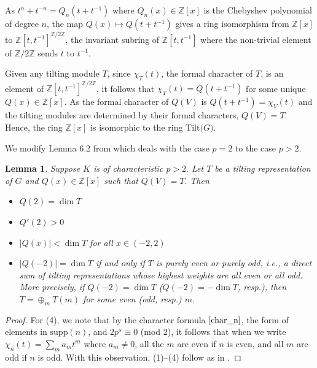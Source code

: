 \documentclass[11 pt]{amsart}
\theoremstyle{plain}
\newtheorem{lemma}[thm]{Lemma}
\theoremstyle{definition}
\theoremstyle{remark}
\def\Z{\mathbb{Z}}
\def\supp{\text{supp}}
\begin{document}
As $t^n+t^{-n}=Q_n(t+t^{-1})$ where $Q_n(x)\in \Z[x]$ is the Chebyshev polynomial of degree $n$, the map $Q(x) \mapsto Q(t+t^{-1})$ gives a ring  isomorphism from $\Z[x]$ to $\Z[t, t^{-1}]^{\Z/2\Z}$, the invariant subring  of $\Z[t, t^{-1}]$ where the non-trivial element of $\Z/2\Z$ sends $t$ to $t^{-1}$. 

Given any tilting module $T$, since $\chi_T(t)$, the formal character of $T$, is an element of $\Z[t, t^{-1}]^{\Z/2\Z}$, it follows that $\chi_T(t)=Q(t+t^{-1})$ for some unique $Q(x) \in \Z[x]$. As the formal character of $Q(V)$ is $Q(t+t^{-1})=\chi_V(t)$ and the tilting modules are determined by their formal characters, $Q(V)=T$. Hence, the ring $\Z[x]$ is isomorphic to the ring $\text{Tilt($G$)}.$

We modify Lemma 6.2 from   \cite{larsen2024boundsmathrmsl2indecomposablestensorpowers} which deals with the case $p=2$ to the case $p>2$.

\begin{lemma} \label{lemma_p}
    Suppose $K$ is of characteristic $p>2.$ Let $T$ be a tilting representation of $G$ and $Q(x)\in \Z[x]$ such that $Q(V)=T.$
    Then
    \begin{itemize}
        \item [(1)] $Q(2)=\dim T$
        \item [(2)] $Q'(2)>0$
        \item[(3)] $\vert Q(x) \vert < \dim T$ for all $x \in (-2, 2)$
        \item[(4)] $\vert Q(-2) \vert =\dim T$ if and only if $T$ is purely even or purely odd, i.e., a direct sum of tilting representations whose highest weights are all even or all odd. More precisely, if $Q(-2)=\dim T$ ($Q(-2)=-\dim T$, resp.), then $T= \oplus_mT(m)$ for some even (odd, resp.) $m$. 
    \end{itemize}
\end{lemma}
\begin{proof}
    For (4), we note that by the character formula $\eqref{char_n}$, the form of elements in $\supp (n)$, and $2p^s \equiv 0$ (mod $2$), it follows that when we write $\chi_n(t)=\sum_m a_mt^m$ where $a_m \neq 0$, all the $m$ are even if $n$ is even, and all $m$ are odd if $n$ is odd. With this observation, (1)--(4) follow as in \cite{larsen2024boundsmathrmsl2indecomposablestensorpowers}.  
    
\end{proof}
\end{document}
